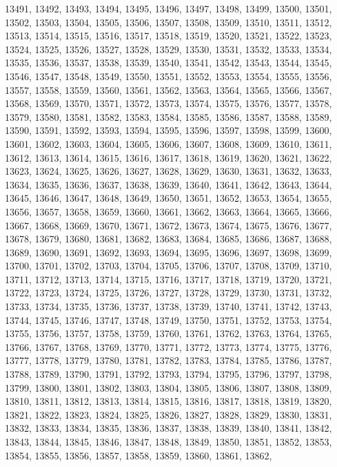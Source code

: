13491,
13492,
13493,
13494,
13495,
13496,
13497,
13498,
13499,
13500,
13501,
13502,
13503,
13504,
13505,
13506,
13507,
13508,
13509,
13510,
13511,
13512,
13513,
13514,
13515,
13516,
13517,
13518,
13519,
13520,
13521,
13522,
13523,
13524,
13525,
13526,
13527,
13528,
13529,
13530,
13531,
13532,
13533,
13534,
13535,
13536,
13537,
13538,
13539,
13540,
13541,
13542,
13543,
13544,
13545,
13546,
13547,
13548,
13549,
13550,
13551,
13552,
13553,
13554,
13555,
13556,
13557,
13558,
13559,
13560,
13561,
13562,
13563,
13564,
13565,
13566,
13567,
13568,
13569,
13570,
13571,
13572,
13573,
13574,
13575,
13576,
13577,
13578,
13579,
13580,
13581,
13582,
13583,
13584,
13585,
13586,
13587,
13588,
13589,
13590,
13591,
13592,
13593,
13594,
13595,
13596,
13597,
13598,
13599,
13600,
13601,
13602,
13603,
13604,
13605,
13606,
13607,
13608,
13609,
13610,
13611,
13612,
13613,
13614,
13615,
13616,
13617,
13618,
13619,
13620,
13621,
13622,
13623,
13624,
13625,
13626,
13627,
13628,
13629,
13630,
13631,
13632,
13633,
13634,
13635,
13636,
13637,
13638,
13639,
13640,
13641,
13642,
13643,
13644,
13645,
13646,
13647,
13648,
13649,
13650,
13651,
13652,
13653,
13654,
13655,
13656,
13657,
13658,
13659,
13660,
13661,
13662,
13663,
13664,
13665,
13666,
13667,
13668,
13669,
13670,
13671,
13672,
13673,
13674,
13675,
13676,
13677,
13678,
13679,
13680,
13681,
13682,
13683,
13684,
13685,
13686,
13687,
13688,
13689,
13690,
13691,
13692,
13693,
13694,
13695,
13696,
13697,
13698,
13699,
13700,
13701,
13702,
13703,
13704,
13705,
13706,
13707,
13708,
13709,
13710,
13711,
13712,
13713,
13714,
13715,
13716,
13717,
13718,
13719,
13720,
13721,
13722,
13723,
13724,
13725,
13726,
13727,
13728,
13729,
13730,
13731,
13732,
13733,
13734,
13735,
13736,
13737,
13738,
13739,
13740,
13741,
13742,
13743,
13744,
13745,
13746,
13747,
13748,
13749,
13750,
13751,
13752,
13753,
13754,
13755,
13756,
13757,
13758,
13759,
13760,
13761,
13762,
13763,
13764,
13765,
13766,
13767,
13768,
13769,
13770,
13771,
13772,
13773,
13774,
13775,
13776,
13777,
13778,
13779,
13780,
13781,
13782,
13783,
13784,
13785,
13786,
13787,
13788,
13789,
13790,
13791,
13792,
13793,
13794,
13795,
13796,
13797,
13798,
13799,
13800,
13801,
13802,
13803,
13804,
13805,
13806,
13807,
13808,
13809,
13810,
13811,
13812,
13813,
13814,
13815,
13816,
13817,
13818,
13819,
13820,
13821,
13822,
13823,
13824,
13825,
13826,
13827,
13828,
13829,
13830,
13831,
13832,
13833,
13834,
13835,
13836,
13837,
13838,
13839,
13840,
13841,
13842,
13843,
13844,
13845,
13846,
13847,
13848,
13849,
13850,
13851,
13852,
13853,
13854,
13855,
13856,
13857,
13858,
13859,
13860,
13861,
13862,
